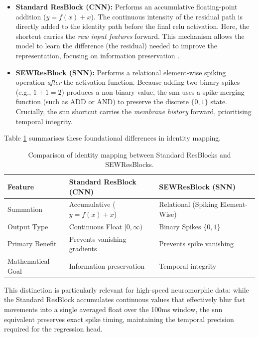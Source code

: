 \begin{itemize}
    \item \textbf{Standard ResBlock (CNN):} 
    Performs an accumulative floating-point addition ($y = f(x) + x$). 
    The continuous intensity of the residual path is directly added to the identity path before the final \gls{relu} activation. 
    Here, the shortcut carries the \textit{raw input features} forward. 
    This mechanism allows the model to learn the difference (the residual) needed to improve the representation, focusing on information preservation \cite{he2015deep}.
    
    \item \textbf{SEWResBlock (SNN):} 
    Performs a relational element-wise spiking operation \textit{after} the activation function. 
    Because adding two binary spikes (e.g., $1+1=2$) produces a non-binary value, the \gls{snn} uses a spike-merging function (such as ADD or AND) to preserve the discrete $\{0, 1\}$ state. 
    Crucially, the \gls{snn} shortcut carries the \textit{membrane history} forward, prioritising temporal integrity.

\end{itemize}

Table \ref{tab:resblock_comparison} summarises these foundational differences in identity mapping.

\begin{table}[htbp]
\centering
\begin{tabularx}{\textwidth}{|>{\raggedright\arraybackslash}p{4cm}|>{\raggedright\arraybackslash}X|>{\raggedright\arraybackslash}X|}
\hline
\textbf{Feature} & \textbf{Standard ResBlock (CNN)} & \textbf{SEWResBlock (SNN)} \\
\hline
Summation & Accumulative ($y = f(x) + x$) & Relational (Spiking Element-Wise) \\
\hline
Output Type & Continuous Float $[0, \infty)$ & Binary Spikes $\{0, 1\}$ \\
\hline
Primary Benefit & Prevents vanishing gradients & Prevents spike vanishing \\
\hline
Mathematical Goal & Information preservation & Temporal integrity \\
\hline
\end{tabularx}
\caption[Identity Mapping Comparison]{Comparison of identity mapping between Standard ResBlocks and SEWResBlocks.}
\label{tab:resblock_comparison}
\end{table}

This distinction is particularly relevant for high-speed neuromorphic data: 
while the Standard ResBlock accumulates continuous values that effectively blur fast movements into a single averaged float over the 100ms window, the \gls{snn} equivalent preserves exact spike timing, maintaining the temporal precision required for the regression head.

